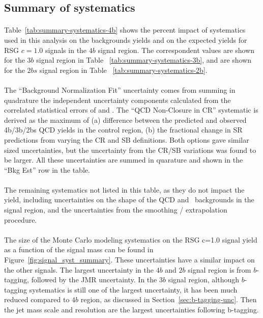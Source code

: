 
\subsection{Summary of systematics}
\label{sec:boosted-systematics-numbers}

\paragraph{}
Table~\ref{tab:summary-systematics-4b} shows the percent impact of systematics used in this analysis on the backgrounds yields and on the expected yields for RSG $c=1.0$ signals in the $4b$ signal region. The correspondent values are shown for the $3b$ signal region in Table ~\ref{tab:summary-systematics-3b}, and are shown for the $2bs$ signal region in Table ~\ref{tab:summary-systematics-2b}.

\paragraph{}
The ``Background Normalization Fit'' uncertainty comes from summing in quadrature the independent uncertainty components calculated from the correlated statistical errors of \muqcd and \alphatt. 
The ``QCD Non-Closure in CR'' systematic is derived as the maximum of (a) difference between the predicted and observed 4b/3b/2bs QCD yields in the control region, (b) the fractional change in SR predictions from varying the CR and SB definitions. 
Both options gave similar sized uncertainties, but the uncertainty from the CR/SB variations was found to be larger. 
All these uncertainties are summed in quarature and shown in the ``Bkg Est'' row in the table.

\paragraph{}
The remaining systematics not listed in this table, as they do not impact the yield, including uncertainties on the shape of the QCD and \ttbar\ backgrounds in the signal region, and the uncertainties from the smoothing / extrapolation procedure.

\paragraph{}
The size of the Monte Carlo modeling systematics on the RSG c=1.0 signal yield as a function of the signal mass can be found in Figure~\ref{fig:signal_syst_summary}. 
These uncertainties have a similar impact on the other signals. The largest uncertainty in the $4b$ and $2b$ signal region is from $b$-tagging, followed by the JMR uncertainty. 
In the $3b$ signal region, although $b$-tagging systematics is still one of the largest uncertainty, it has been much reduced compared to $4b$ region, as discussed in Section~\ref{sec:b-tagging-unc}. 
Then the jet mass scale and resolution are the largest uncertainties following b-tagging. 

